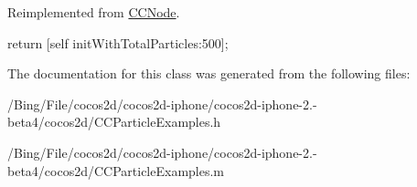 Reimplemented from \hyperlink{class_c_c_node_ad789cad83aca65c130abd4452d1bc081}{C\-C\-Node}.


\begin{DoxyCode}
{
        return [self initWithTotalParticles:500];
}
\end{DoxyCode}


The documentation for this class was generated from the following files\-:\begin{DoxyCompactItemize}
\item 
/\-Bing/\-File/cocos2d/cocos2d-\/iphone/cocos2d-\/iphone-\/2.-\/beta4/cocos2d/C\-C\-Particle\-Examples.\-h\item 
/\-Bing/\-File/cocos2d/cocos2d-\/iphone/cocos2d-\/iphone-\/2.-\/beta4/cocos2d/C\-C\-Particle\-Examples.\-m\end{DoxyCompactItemize}
